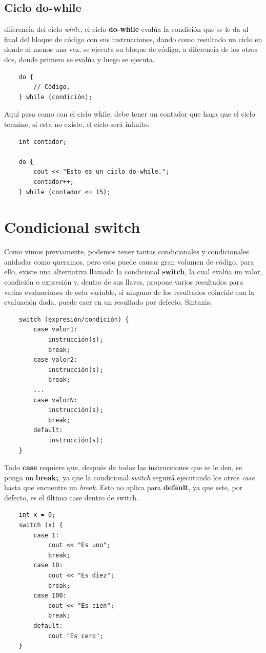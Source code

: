 \subsection{Ciclo do-while}
\hspace{0.55cm} diferencia del ciclo \textit{while}, el ciclo \textbf{do-while} evalúa la condición que se le da al final del bloque de código con sus instrucciones, dando como resultado un ciclo en donde al menos una vez, se ejecuta su bloque de código, a diferencia de los otros dos, donde primero se evalúa y luego se ejecuta.
\begin{lstlisting}
    do {
        // Código.
    } while (condición);
\end{lstlisting}

Aquí pasa como con el ciclo while, debe tener un contador que haga que el ciclo termine, si esta no existe, el ciclo será infinito.
\begin{lstlisting}
    int contador;
    
    do {
        cout << "Esto es un ciclo do-while.";
        contador++;
    } while (contador <= 15);
\end{lstlisting}



\section{Condicional switch}
\hspace{0.55cm}Como vimos previamente, podemos tener tantas condicionales y condicionales anidadas como queramos, pero esto puede causar gran volumen de código, para ello, existe una alternativa llamada la condicional \textbf{switch}, la cual evalúa un valor, condición o expresión y,  dentro de sus llaves, propone varios resultados para varias evaluaciones de esta variable, si ninguno de los resultados coincide con la evaluación dada, puede caer en un resultado por defecto. Sintaxis:
\begin{lstlisting}
    switch (expresión/condición) {
        case valor1:
            instrucción(s);
            break;
        case valor2:
            instrucción(s);
            break;
        ...
        case valorN:
            instrucción(s);
            break;
        default:
            instrucción(s);
    }
\end{lstlisting}

Todo \textbf{case} requiere que, después de todas las instrucciones que se le den, se ponga un \textbf{break;}, ya que la condicional \textit{switch} seguirá ejecutando los otros \textit{case} hasta que encuentre un \textit{break}. Esto no aplica para \textbf{default}, ya que este, por defecto, es el último case dentro de switch.
\begin{lstlisting}
    int x = 0;
    switch (x) {
        case 1:
            cout << "Es uno";
            break;
        case 10:
            cout << "Es diez";
            break;
        case 100:
            cout << "Es cien";
            break;
        default:
            cout "Es cero";
    }
\end{lstlisting}

